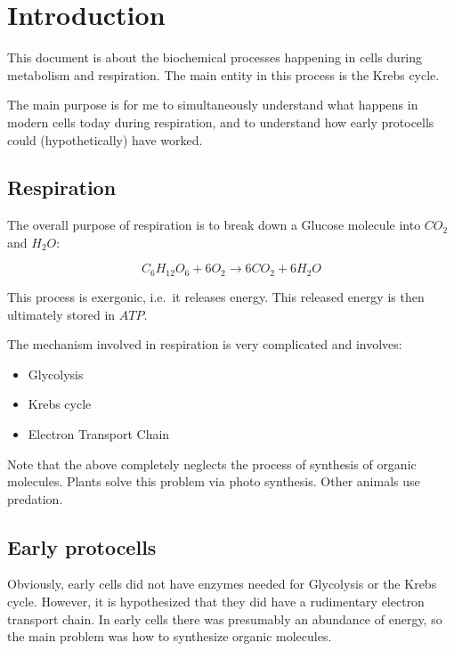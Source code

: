 \documentclass{article}
\begin{document}

\section{Introduction}

This document is about the biochemical processes happening in cells during metabolism and
respiration. The main entity in this process is the Krebs cycle.

The main purpose is for me to simultaneously understand what happens in modern cells today
during respiration, and to understand how early protocells could (hypothetically) have
worked.

\subsection{Respiration}
The overall purpose of respiration is to break down a Glucose molecule into $CO_2$ and
$H_2O$:

\[
    C_6H_{12}O_6 + 6O_2 \rightarrow 6CO_2 + 6H_2O
\]

This process is exergonic, i.e.\ it releases energy. This released energy is then
ultimately stored in $ATP$.

The mechanism involved in respiration is very complicated and involves:
\begin{itemize}
    \item Glycolysis
    \item Krebs cycle
    \item Electron Transport Chain
\end{itemize}

Note that the above completely neglects the process of synthesis of organic molecules.
Plants solve this problem via photo synthesis. Other animals use predation.

\subsection{Early protocells}
Obviously, early cells did not have enzymes needed for Glycolysis or the Krebs cycle.
However, it is hypothesized that they did have a rudimentary electron transport chain.
In early cells there was presumably an abundance of energy, so the main problem was
how to synthesize organic molecules.
\end{document}
